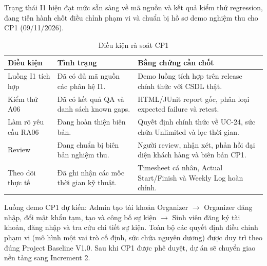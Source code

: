 
Trạng thái I1 hiện đạt mức sẵn sàng về mã nguồn và kết quả kiểm thử regression, đang tiến hành chốt điều chỉnh phạm vi và chuẩn bị hồ sơ demo nghiệm thu cho CP1 (09/11/2026).

\begin{table}[H]
\centering\small
\caption{Điều kiện rà soát CP1}\label{tab:i1-gate}
\begin{tabularx}{\linewidth}{@{}p{.25\linewidth}XX@{}}
\toprule
\textbf{Điều kiện} & \textbf{Tình trạng} & \textbf{Bằng chứng cần chốt}\\\midrule
Luồng I1 tích hợp & Đã có đủ mã nguồn các phân hệ I1. & Demo luồng tích hợp trên release chính thức với CSDL thật.\\
Kiểm thử A06 & Đã có kết quả QA và danh sách known gaps. & HTML/JUnit report gốc, phân loại expected failure và retest.\\
Làm rõ yêu cầu RA06 & Đang hoàn thiện biên bản. & Quyết định chính thức về UC-24, sức chứa Unlimited và lọc thời gian.\\
Review & Đang chuẩn bị biên bản nghiệm thu. & Người review, nhận xét, phản hồi đại diện khách hàng và biên bản CP1.\\
Theo dõi thực tế & Đã ghi nhận các mốc thời gian kỹ thuật. & Timesheet cá nhân, Actual Start/Finish và Weekly Log hoàn chỉnh.\\
\bottomrule
\end{tabularx}
\end{table}

Luồng demo CP1 dự kiến: Admin tạo tài khoản Organizer $\to$ Organizer đăng nhập, đổi mật khẩu tạm, tạo và công bố sự kiện $\to$ Sinh viên đăng ký tài khoản, đăng nhập và tra cứu chi tiết sự kiện. Toàn bộ các quyết định điều chỉnh phạm vi (mô hình một vai trò cố định, sức chứa nguyên dương) được duy trì theo đúng Project Baseline V1.0. Sau khi CP1 được phê duyệt, dự án sẽ chuyển giao nền tảng sang Increment 2.


